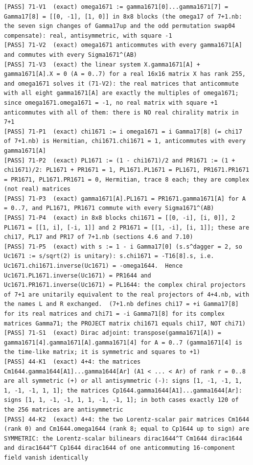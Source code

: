 \documentclass[
  10pt,
]{article}
\begin{document}
\begin{verbatim}
[PASS] 71-V1  (exact) omega1671 := gamma1671[0]...gamma1671[7] = Gamma17[8] = [[0, -1], [1, 0]] in 8x8 blocks (the omega17 of 7+1.nb: the seven sign changes of Gamma17up and the odd permutation swap04 compensate): real, antisymmetric, with square -1
[PASS] 71-V2  (exact) omega1671 anticommutes with every gamma1671[A] and commutes with every Sigma1671^(AB)
[PASS] 71-V3  (exact) the linear system X.gamma1671[A] + gamma1671[A].X = 0 (A = 0..7) for a real 16x16 matrix X has rank 255, and omega1671 solves it (71-V2): the real matrices that anticommute with all eight gamma1671[A] are exactly the multiples of omega1671; since omega1671.omega1671 = -1, no real matrix with square +1 anticommutes with all of them: there is NO real chirality matrix in 7+1
[PASS] 71-P1  (exact) chi1671 := i omega1671 = i Gamma17[8] (= chi17 of 7+1.nb) is Hermitian, chi1671.chi1671 = 1, anticommutes with every gamma1671[A]
[PASS] 71-P2  (exact) PL1671 := (1 - chi1671)/2 and PR1671 := (1 + chi1671)/2: PL1671 + PR1671 = 1, PL1671.PL1671 = PL1671, PR1671.PR1671 = PR1671, PL1671.PR1671 = 0, Hermitian, trace 8 each; they are complex (not real) matrices
[PASS] 71-P3  (exact) gamma1671[A].PL1671 = PR1671.gamma1671[A] for A = 0..7, and PL1671, PR1671 commute with every Sigma1671^(AB)
[PASS] 71-P4  (exact) in 8x8 blocks chi1671 = [[0, -i], [i, 0]], 2 PL1671 = [[1, i], [-i, 1]] and 2 PR1671 = [[1, -i], [i, 1]]; these are chi17, PL17 and PR17 of 7+1.nb (sections 4.6 and 7.10)
[PASS] 71-P5  (exact) with s := 1 - i Gamma17[0] (s.s^dagger = 2, so Uc1671 := s/sqrt(2) is unitary): s.chi1671 = -T16[8].s, i.e. Uc1671.chi1671.inverse(Uc1671) = -omega1644.  Hence Uc1671.PL1671.inverse(Uc1671) = PR1644 and Uc1671.PR1671.inverse(Uc1671) = PL1644: the complex chiral projectors of 7+1 are unitarily equivalent to the real projectors of 4+4.nb, with the names L and R exchanged.  (7+1.nb defines chi17 = +i Gamma17[8] for its real matrices and chi71 = -i Gamma71[8] for its complex matrices Gamma71; the PROJECT matrix chi1671 equals chi17, NOT chi71)
[PASS] 71-S1  (exact) Dirac adjoint: transpose(gamma1671[A]) = gamma1671[4].gamma1671[A].gamma1671[4] for A = 0..7 (gamma1671[4] is the time-like matrix; it is symmetric and squares to +1)
[PASS] 44-K1  (exact) 4+4: the matrices Cm1644.gamma1644[A1]...gamma1644[Ar] (A1 < ... < Ar) of rank r = 0..8 are all symmetric (+) or all antisymmetric (-): signs [1, -1, -1, 1, 1, -1, -1, 1, 1]; the matrices Cp1644.gamma1644[A1]...gamma1644[Ar]: signs [1, 1, -1, -1, 1, 1, -1, -1, 1]; in both cases exactly 120 of the 256 matrices are antisymmetric
[PASS] 44-K2  (exact) 4+4: the two Lorentz-scalar pair matrices Cm1644 (rank 0) and Cm1644.omega1644 (rank 8; equal to Cp1644 up to sign) are SYMMETRIC: the Lorentz-scalar bilinears dirac1644^T Cm1644 dirac1644 and dirac1644^T Cp1644 dirac1644 of one anticommuting 16-component field vanish identically

\end{verbatim}
\end{document}

